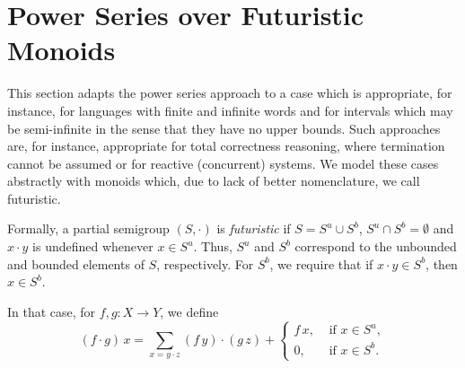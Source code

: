 \documentclass[12pt]{article}
\theoremstyle{definition}
\begin{document}
\section{Power Series over Futuristic Monoids}\label{sec:futuristic}

This section adapts the power series approach to a case which is
appropriate, for instance, for languages with finite and infinite
words and for intervals which may be semi-infinite in the sense that
they have no upper bounds.  Such approaches are, for instance,
appropriate for total correctness reasoning, where termination cannot
be assumed or for reactive (concurrent) systems. We model these cases
abstractly with monoids which, due to lack of better nomenclature, we
call futuristic.

Formally, a partial semigroup $(S,\cdot)$ is \emph{futuristic} if
$S=S^u\cup S^b$, $S^u\cap S^b=\emptyset$ and $x\cdot y$ is undefined
whenever $x\in S^u$. Thus, $S^u$ and $S^b$ correspond to the unbounded
and bounded elements of $S$, respectively. For $S^b$, we require that if
$x \cdot y \in S^b$, then $x \in S^b$.

In that case, for $f,g:X\to Y$, we define
\begin{equation*}
  (f\cdot g)\, x =  \sum_{x=y\cdot z} (f\, y)\cdot (g\, z) +
  \begin{cases}
    f\, x, &\text{ if } x\in S^u,\\
    0, & \text{ if } x\in S^b.
  \end{cases}
\end{equation*}
\end{document}
